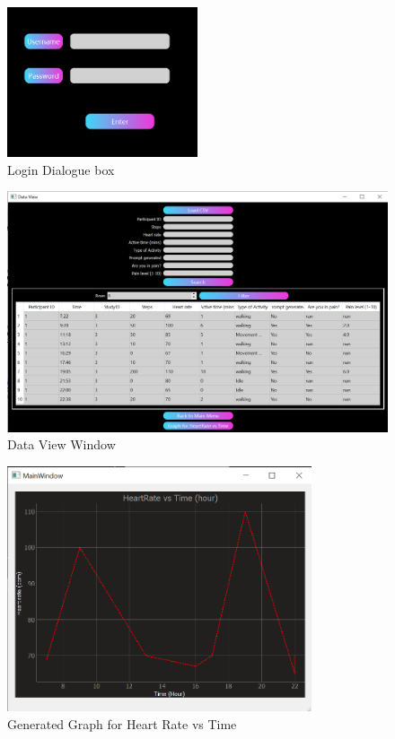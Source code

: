 \documentclass[12pt, titlepage]{article}
\begin{document}
\begin{figure}[H]
	\begin{center}
		 \includegraphics[width=0.5\textwidth]{login}
		\caption{Login Dialogue box}
		\label{Login} 
	\end{center}
\end{figure}

\begin{figure}[H]
	\begin{center}
		 \includegraphics[width=1\textwidth]{DataView}
		\caption{Data View Window}
		\label{DataView} 
	\end{center}
\end{figure}

\begin{figure}[H]
	\begin{center}
		 \includegraphics[width=0.8\textwidth]{Graph}
		\caption{Generated Graph for Heart Rate vs Time}
		\label{Graph} 
	\end{center}
\end{figure}
\end{document}
